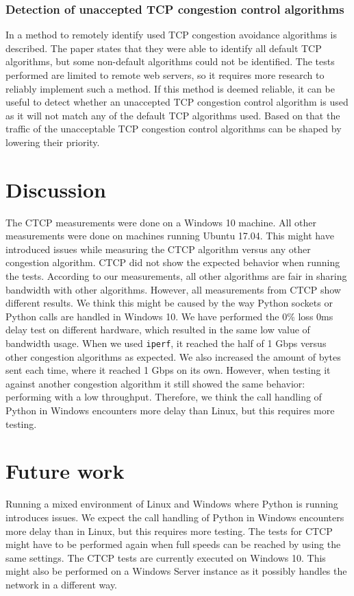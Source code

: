 \documentclass{article}
\begin{document}
\subsubsection{Detection of unaccepted TCP congestion control algorithms}
In \cite{tcp-congestion-identification} a method to remotely identify used TCP congestion avoidance algorithms is described. The paper states that 
they were able to identify all default TCP algorithms, but some non-default algorithms could not be identified. The tests performed are limited to remote web servers, so it requires more research to reliably implement such a method. If this method is deemed reliable, it can be useful to detect whether an unaccepted TCP congestion control algorithm is used as it will not match any of the default TCP algorithms used. Based on that the traffic of the unacceptable TCP congestion control algorithms can be shaped by lowering their priority.

\section{Discussion}\label{sec:discussion}
The CTCP measurements were done on a Windows 10 machine. All other measurements were done on machines running Ubuntu 17.04. This might have introduced issues while measuring the CTCP algorithm versus any other congestion algorithm. CTCP did not show the expected behavior when running the tests. According to our measurements, all other algorithms are fair in sharing bandwidth with other algorithms. However, all measurements from CTCP show different results. We think this might be caused by the way Python sockets or Python calls are handled in Windows 10. We have performed the 0\% loss 0ms delay test on different hardware, which resulted in the same low value of bandwidth usage. When we used \texttt{iperf}, it reached the half of 1 Gbps versus other congestion algorithms as expected. We also increased the amount of bytes sent each time, where it reached 1 Gbps on its own. However, when testing it against another congestion algorithm it still showed the same behavior: performing with a low throughput. Therefore, we think the call handling of Python in Windows encounters more delay than Linux, but this requires more testing.

\section{Future work}\label{sec:futurework}
Running a mixed environment of Linux and Windows where Python is running introduces issues. We expect the call handling of Python in Windows encounters more delay than in Linux, but this requires more testing. The tests for CTCP might have to be performed again when full speeds can be reached by using the same settings. 
The CTCP tests are currently executed on Windows 10. This might also be performed on a Windows Server instance as it possibly handles the network in a different way.
\end{document}
